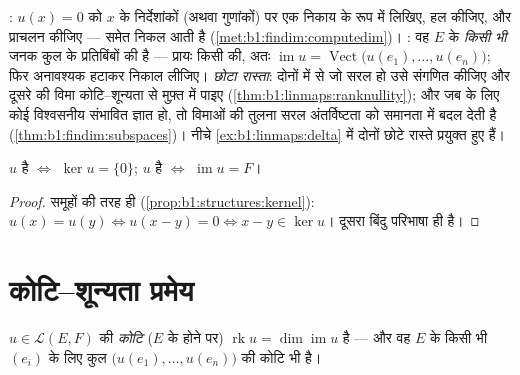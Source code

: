 \begin{method}[अष्टि और प्रतिबिंब, व्यवहार में]
\label{met:b1:linmaps:kerim}
\emph{}: $u(x) = 0$ को $x$ के निर्देशांकों (अथवा गुणांकों) पर एक निकाय
के रूप में लिखिए, हल कीजिए, और प्राचलन कीजिए ---   समेत निकल आती है
(\cref{met:b1:findim:computedim})। \emph{}: वह $E$ के \emph{किसी
भी} जनक कुल के प्रतिबिंबों की  है --- प्रायः किसी  की, अतः
$\operatorname{im} u = \operatorname{Vect}\bigl(u(e_1), \dots,
u(e_n)\bigr)$; फिर अनावश्यक  हटाकर  निकाल लीजिए। \emph{छोटा
रास्ता}: दोनों में से जो सरल हो उसे संगणित कीजिए और दूसरे की विमा
कोटि--शून्यता से मुफ़्त में पाइए (\cref{thm:b1:linmaps:ranknullity}); और जब
 के लिए कोई विश्वसनीय संभावित  ज्ञात हो, तो विमाओं की तुलना
सरल अंतर्विष्टता को समानता में बदल देती है (\cref{thm:b1:findim:subspaces})।
नीचे \cref{ex:b1:linmaps:delta} में दोनों छोटे रास्ते प्रयुक्त हुए हैं।
\end{method}

\begin{proposition}\label{prop:b1:linmaps:kernel}
$u$  है $\iff$ $\ker u = \{0\}$; $u$  है $\iff$
$\operatorname{im} u = F$।
\end{proposition}

\begin{proof}
समूहों की तरह ही (\cref{prop:b1:structures:kernel}): $u(x) = u(y) \iff u(x -
y) = 0 \iff x - y \in \ker u$। दूसरा बिंदु परिभाषा ही है।
\end{proof}

\section{कोटि--शून्यता प्रमेय}

\begin{definition}\label{def:b1:linmaps:rank}
$u \in \mathcal{L}(E, F)$ की \emph{कोटि} ($E$ के  होने पर) $\operatorname{rk} u = \dim
\operatorname{im} u$ है --- और वह $E$ के किसी भी  $(e_i)$ के लिए कुल
$\bigl(u(e_1), \dots, u(e_n)\bigr)$ की कोटि भी है।
\end{definition}

